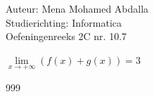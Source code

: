 \documentclass[a4paper]{article}
\begin{document}
\noindent \large Auteur: Mena Mohamed Abdalla \\
\noindent \large Studierichting:  Informatica\\
\noindent \large Oefeningenreeks 2C nr. 10.7\\

\medskip

\normalsize


$\lim\limits_{x \rightarrow +\infty} (f(x) + g(x)) = 3$\\








\begin{thebibliography}{999}
\end{thebibliography}
\end{document}
